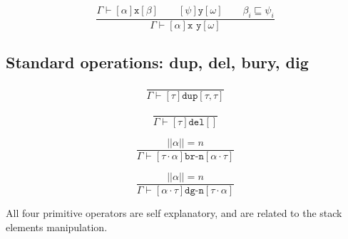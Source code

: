 \documentclass{article}
\newcommand{\op}[3]{[#1] \texttt{#2} [#3]}
\begin{document}
\begin{equation*}
  \tag{Underflow}
  \frac{
    \Gamma \vdash
    \op{\alpha}{x}{\beta} \qquad
    \op{\psi}{y}{\omega} \qquad
    \beta_i \sqsubseteq \psi_i
  }{
    \Gamma \vdash \op{\alpha}{x y}{\omega}
  }
\end{equation*}

\subsection*{Standard operations: dup, del, bury, dig}

\begin{equation*}
  \tag{Dup}
  \frac{
    \,
  }{
    \Gamma \vdash
    \op{\tau}{dup}{\tau, \tau}
  }
\end{equation*}

\begin{equation*}
  \tag{Del}
  \frac{
    \,
  }{
    \Gamma \vdash
    \op{\tau}{del}{}
  }
\end{equation*}

\begin{equation*}
  \tag{Bury}
  \frac{
    ||\alpha|| = n
  }{
    \Gamma \vdash
    \op{\tau \cdot \alpha}{br-n}{\alpha \cdot \tau}
  }
\end{equation*}

\begin{equation*}
  \tag{Dig}
  \frac{
    ||\alpha|| = n
  }{
    \Gamma \vdash
    \op{\alpha \cdot \tau}{dg-n}{\tau \cdot \alpha}
  }
\end{equation*}

All four primitive operators are self explanatory, and are related to the stack elements manipulation.
\end{document}
